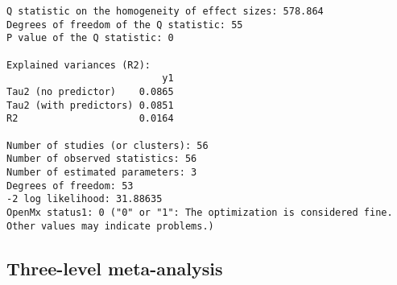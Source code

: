 \documentclass[11pt]{article}
\begin{document}
\begin{enumerate}
\begin{verbatim}
Q statistic on the homogeneity of effect sizes: 578.864
Degrees of freedom of the Q statistic: 55
P value of the Q statistic: 0

Explained variances (R2):
                           y1
Tau2 (no predictor)    0.0865
Tau2 (with predictors) 0.0851
R2                     0.0164

Number of studies (or clusters): 56
Number of observed statistics: 56
Number of estimated parameters: 3
Degrees of freedom: 53
-2 log likelihood: 31.88635 
OpenMx status1: 0 ("0" or "1": The optimization is considered fine.
Other values may indicate problems.)
\end{verbatim}
\end{enumerate}

\subsection{Three-level meta-analysis}
\label{sec:org18b8f44}
\end{document}
